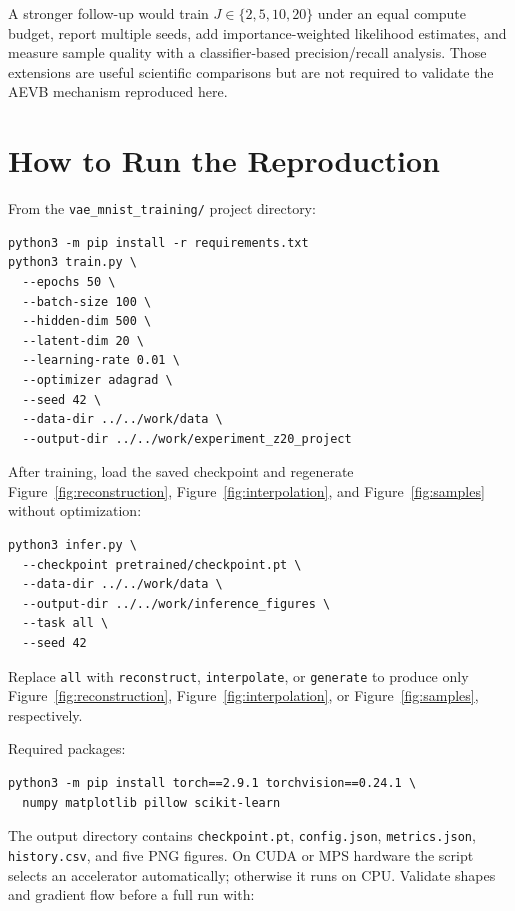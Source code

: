 \documentclass[11pt]{article}
\newcommand{\code}[1]{\texttt{#1}}
\begin{document}
A stronger follow-up would train $J\in\{2,5,10,20\}$ under an equal compute budget, report multiple seeds, add importance-weighted likelihood estimates, and measure sample quality with a classifier-based precision/recall analysis. Those extensions are useful scientific comparisons but are not required to validate the AEVB mechanism reproduced here.

\appendix
\section{How to Run the Reproduction}
\label{app:run}

From the \code{vae\_mnist\_training/} project directory:

\begin{lstlisting}[style=pythonstyle]
python3 -m pip install -r requirements.txt
python3 train.py \
  --epochs 50 \
  --batch-size 100 \
  --hidden-dim 500 \
  --latent-dim 20 \
  --learning-rate 0.01 \
  --optimizer adagrad \
  --seed 42 \
  --data-dir ../../work/data \
  --output-dir ../../work/experiment_z20_project
\end{lstlisting}

After training, load the saved checkpoint and regenerate Figure~\ref{fig:reconstruction}, Figure~\ref{fig:interpolation}, and Figure~\ref{fig:samples} without optimization:

\begin{lstlisting}[style=pythonstyle]
python3 infer.py \
  --checkpoint pretrained/checkpoint.pt \
  --data-dir ../../work/data \
  --output-dir ../../work/inference_figures \
  --task all \
  --seed 42
\end{lstlisting}

Replace \code{all} with \code{reconstruct}, \code{interpolate}, or \code{generate} to produce only Figure~\ref{fig:reconstruction}, Figure~\ref{fig:interpolation}, or Figure~\ref{fig:samples}, respectively.

Required packages:

\begin{lstlisting}[style=pythonstyle]
python3 -m pip install torch==2.9.1 torchvision==0.24.1 \
  numpy matplotlib pillow scikit-learn
\end{lstlisting}

The output directory contains \code{checkpoint.pt}, \code{config.json}, \code{metrics.json}, \code{history.csv}, and five PNG figures. On CUDA or MPS hardware the script selects an accelerator automatically; otherwise it runs on CPU. Validate shapes and gradient flow before a full run with:
\end{document}

